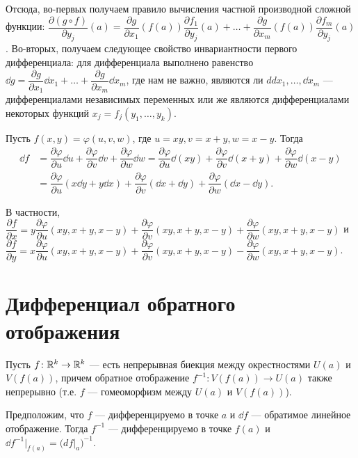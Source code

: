 \documentclass[a4paper]{article}
\theoremstyle{named}
\begin{document}
\begin{remark*}
        Отсюда, во-первых получаем правило вычисления частной производной сложной функции:
        $\dfrac{\partial (g\circ f)}{\partial y_j}(a) =
        \dfrac{\partial g}{\partial x_1}(f(a)) \dfrac{\partial f_1}{\partial y_j}(a)+\ldots+
        \dfrac{\partial g}{\partial x_m}(f(a)) \dfrac{\partial f_m}{\partial y_j}(a)$.
        Во-вторых, получаем следующее свойство инвариантности первого дифференциала:
        для дифференциала выполнено равенство
        $\dd g = \dfrac{\partial g}{\partial x_1}\dd x_1+\ldots+\dfrac{\partial g}{\partial x_m}\dd x_m$,
        где нам не важно, являются ли $
        dd x_1,\ldots, \dd x_m$ --- дифференциалами независимых переменных
        или же являются дифференциалами некоторых функций $x_j = f_j(y_1,\ldots, y_k)$.
    \end{remark*}

    \begin{example*}
        Пусть $f(x,y) = \varphi(u, v, w)$, где $u=xy, v= x+y, w=x-y$.
        Тогда
        \begin{align*}
            \dd f 
            &= \dfrac{\partial \varphi}{\partial u} \dd u + \dfrac{\partial \varphi}{\partial v} \dd v + \dfrac{\partial \varphi}{\partial w} \dd w 
            = \dfrac{\partial \varphi}{\partial u} \dd(xy) + \dfrac{\partial \varphi}{\partial v} \dd(x+y) + \dfrac{\partial \varphi}{\partial w} \dd(x-y) \\
            &= \dfrac{\partial \varphi}{\partial u} (x\dd y + y\dd x) +
            \dfrac{\partial \varphi}{\partial v} (\dd x+\dd y) + \dfrac{\partial \varphi}{\partial w} (\dd x - \dd y).
        \end{align*}

        В частности,
        $\dfrac{\partial f}{\partial x} = y\dfrac{\partial \varphi}{\partial u}(xy, x+y, x-y) +
        \dfrac{\partial \varphi}{\partial v}(xy, x+y, x-y) +  \dfrac{\partial \varphi}{\partial w}(xy, x+y, x-y)$
        и $\dfrac{\partial f}{\partial y} = x\dfrac{\partial \varphi}{\partial u}(xy, x+y, x-y) +
        \dfrac{\partial \varphi}{\partial v}(xy, x+y, x-y) -  \dfrac{\partial \varphi}{\partial w}(xy, x+y, x-y)$.
    \end{example*}

    \section{Дифференциал обратного отображения}

    \begin{theorem*}
        Пусть $f\colon \mathbb{R}^k\to \mathbb{R}^k$ --- есть непрерывная биекция между окрестностями $U(a)$ и $V(f(a))$,
        причем обратное отображение $f^{-1}\colon V(f(a))\to U(a)$ также непрерывно (т.е. $f$ --- гомеоморфизм между $U(a)$ и $V(f(a))$).

        Предположим, что $f$ --- дифференцируемо в точке $a$ и $\dd f$ --- обратимое линейное отображение.
        Тогда $f^{-1}$ --- дифференцируемо в точке $f(a)$ и $\dd f^{-1}\bigl|_{f(a)} = \bigr(df\bigl|_a\bigl)^{-1}$.
    \end{theorem*}
\end{document}
